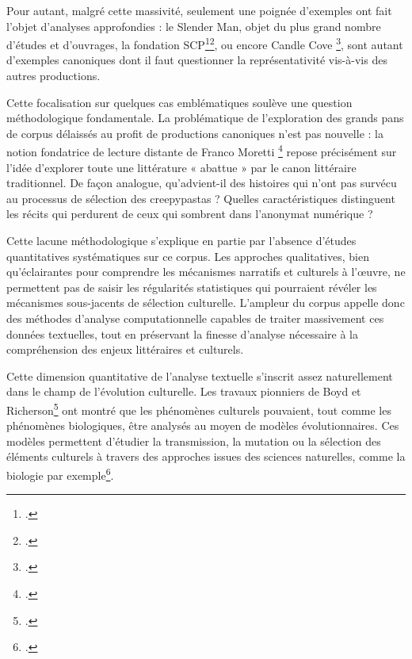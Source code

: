 \documentclass[12pt,a4paper,oneside,titlepage]{book} %
\begin{document}
Pour autant, malgré cette massivité, seulement une poignée d'exemples ont fait l'objet d'analyses approfondies : le Slender Man, objet du plus grand nombre d'études et d'ouvrages, la fondation SCP\footcite{maurel:dumas-04760430}\footcite{garcia_roca_fundacion_2021}, ou encore Candle Cove \footcite{balanzategui_creepypasta_2019}, sont autant d'exemples canoniques dont il faut questionner la représentativité vis-à-vis des autres productions.

Cette focalisation sur quelques cas emblématiques soulève une question méthodologique fondamentale. La problématique de l'exploration des grands pans de corpus délaissés au profit de productions canoniques n'est pas nouvelle : la notion fondatrice de lecture distante de Franco Moretti \footcite{moretti2013distant} repose précisément sur l'idée d'explorer toute une littérature « abattue » par le canon littéraire traditionnel. De façon analogue, qu'advient-il des histoires qui n'ont pas survécu au processus de sélection des creepypastas ? Quelles caractéristiques distinguent les récits qui perdurent de ceux qui sombrent dans l'anonymat numérique ?

Cette lacune méthodologique s'explique en partie par l'absence d'études quantitatives systématiques sur ce corpus. Les approches qualitatives, bien qu'éclairantes pour comprendre les mécanismes narratifs et culturels à l'œuvre, ne permettent pas de saisir les régularités statistiques qui pourraient révéler les mécanismes sous-jacents de sélection culturelle. L'ampleur du corpus appelle donc des méthodes d'analyse computationnelle capables de traiter massivement ces données textuelles, tout en préservant la finesse d'analyse nécessaire à la compréhension des enjeux littéraires et culturels.

Cette dimension quantitative de l'analyse textuelle s'inscrit assez naturellement dans le champ de l'évolution culturelle. Les travaux pionniers de Boyd et Richerson\footcite{boyd1988culture} ont montré que les phénomènes culturels pouvaient, tout comme les phénomènes biologiques, être analysés au moyen de modèles évolutionnaires. Ces modèles permettent d’étudier la transmission, la mutation ou la sélection des éléments culturels à travers des approches issues des sciences naturelles, comme la biologie par exemple\footcite{el2014cultural}.
\end{document}
